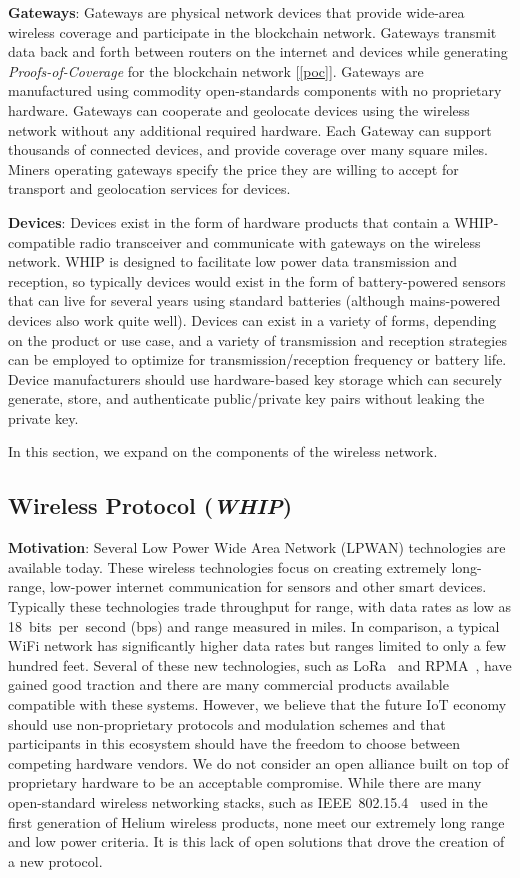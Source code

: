 \documentclass[letterpaper,11pt]{article}
\begin{document}
\textbf{Gateways}: Gateways are physical network devices that provide wide-area wireless coverage and participate in the blockchain network. Gateways transmit data back and forth between routers on the internet and devices while generating \emph{Proofs-of-Coverage} for the blockchain network [\ref{poc}]. Gateways are manufactured using commodity open-standards components with no proprietary hardware. Gateways can cooperate and geolocate devices using the wireless network without any additional required hardware. Each Gateway can support thousands of connected devices, and provide coverage over many square miles. Miners operating gateways specify the price they are willing to accept for transport and geolocation services for devices.

\textbf{Devices}: Devices exist in the form of hardware products that contain a WHIP-compatible radio transceiver and communicate with gateways on the wireless network. WHIP is designed to facilitate low power data transmission and reception, so typically devices would exist in the form of battery-powered sensors that can live for several years using standard batteries (although mains-powered devices also work quite well). Devices can exist in a variety of forms, depending on the product or use case, and a variety of transmission and reception strategies can be employed to optimize for transmission/reception frequency or battery life. Device manufacturers should use hardware-based key storage which can securely generate, store, and authenticate public/private key pairs without leaking the private key.

In this section, we expand on the components of the wireless network.

\subsection{Wireless Protocol (\emph{WHIP})}\label{whip}

\textbf{Motivation}: Several Low Power Wide Area Network (LPWAN) technologies are available today. These wireless technologies focus on creating extremely long-range, low-power internet communication for sensors and other smart devices. Typically these technologies trade throughput for range, with data rates as low as 18~bits~per~second (bps) and range measured in miles. In comparison, a typical WiFi network has significantly higher data rates but ranges limited to only a few hundred feet. Several of these new technologies, such as LoRa~\cite{lora} and RPMA~\cite{rpma}, have gained good traction and there are many commercial products available compatible with these systems. However, we believe that the future IoT economy should use non-proprietary protocols and modulation schemes and that participants in this ecosystem should have the freedom to choose between competing hardware vendors. We do not consider an open alliance built on top of proprietary hardware to be an acceptable compromise. While there are many open-standard wireless networking stacks, such as IEEE~802.15.4~\cite{ieee802_15_4} used in the first generation of Helium wireless products, none meet our extremely long range and low power criteria. It is this lack of open solutions that drove the creation of a new protocol.
\end{document}
